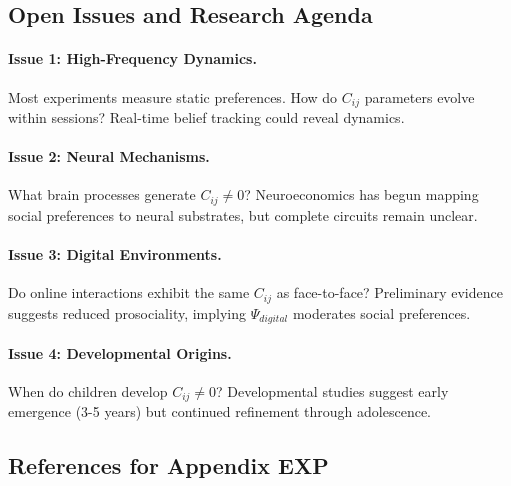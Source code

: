 
\subsection{Open Issues and Research Agenda}
\label{sec:EV-openissues}

\paragraph{Issue 1: High-Frequency Dynamics.}
Most experiments measure static preferences. How do $C_{ij}$ parameters
evolve within sessions? Real-time belief tracking could reveal dynamics.

\paragraph{Issue 2: Neural Mechanisms.}
What brain processes generate $C_{ij} \neq 0$? Neuroeconomics has begun
mapping social preferences to neural substrates, but complete circuits
remain unclear.

\paragraph{Issue 3: Digital Environments.}
Do online interactions exhibit the same $C_{ij}$ as face-to-face?
Preliminary evidence suggests reduced prosociality, implying $\Psi_{digital}$
moderates social preferences.

\paragraph{Issue 4: Developmental Origins.}
When do children develop $C_{ij} \neq 0$? Developmental studies suggest
early emergence (3-5 years) but continued refinement through adolescence.


\subsection{References for Appendix EXP}
\label{sec:EV-references}

